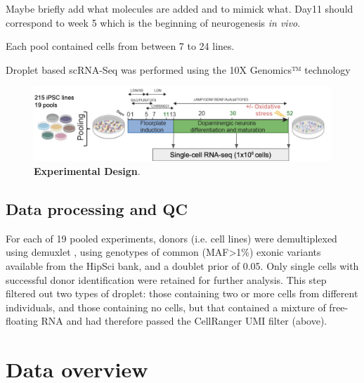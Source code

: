 Maybe briefly add what molecules are added and to mimick what.
Day11 should correspond to week 5 which is the beginning of neurogenesis \textit{in vivo}. 

Each pool contained cells from between 7 to 24 lines.

Droplet based scRNA-Seq was performed using the 10X Genomics™ technology \cite{zheng2017massively}

\begin{figure}[h]
\centering
\includegraphics[width=16cm]{Chapter5/Fig/neuroseq_experimental_design.png}
\caption[\textbf{Experimental Design}]{\textbf{Experimental Design}.\\
}
\label{fig:neuroseq_experimental_design}
\end{figure}

\subsection{Data processing and QC}

For each of 19 pooled experiments, donors (i.e. cell lines) were demultiplexed using demuxlet \cite{kang2018multiplexed}, using genotypes of common (MAF>1\%) exonic variants available from the HipSci bank, and a doublet prior of 0.05. 
Only single cells with successful donor identification were retained for further analysis. 
This step filtered out two types of droplet: those containing two or more cells from different individuals, and those containing no cells, but that contained a mixture of free-floating RNA and had therefore passed the CellRanger UMI filter (above).




\section{Data overview}

